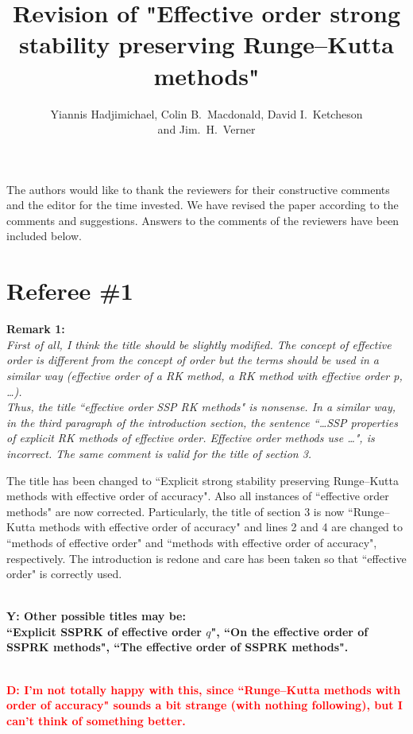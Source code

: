 \documentclass[12pt]{article}
\newcommand{\remark}[2]{\vspace{25pt} \noindent \textbf{Remark #1:\newline} \textit{#2}\vspace{15pt}}
\renewcommand{\newline}{\vspace{15pt}\\}
\newcommand{\david}[1]{\textcolor{red}{\\\textbf{D: \footnotesize #1}\\}}
\newcommand{\yiannis}[1]{\textcolor{OliveGreen}{\\\textbf{Y: \footnotesize #1}\\}}
\begin{document}
\title{Revision of "Effective order strong stability preserving Runge--Kutta methods"}
\author{Yiannis Hadjimichael, Colin B.~Macdonald, David I.~Ketcheson \\ and  Jim.~H.~Verner}

\maketitle

The authors would like to thank the reviewers for their constructive comments and the
editor for the time invested. 
We have revised the paper according to the comments and suggestions. 
Answers to the comments of the reviewers have been included below.
\vspace{30pt}

\section*{Referee \#1}
\remark{1}
{First of all, I think the title should be slightly modified. 
The concept of \textit{effective order} is different from the concept of \textit{order} 
but the terms should be used in a similar way (\textit{effective order of a RK method, 
a RK method with effective order p, \dots}).
\newline
Thus, the title ``effective order SSP RK methods" is nonsense.
In a similar way, in the third paragraph of the introduction section, the sentence 
``\dots SSP properties of explicit RK methods of effective order. Effective order 
methods use \dots", is incorrect.
The same comment is valid for the title of section 3.}

The title has been changed to ``Explicit strong stability preserving Runge--Kutta methods
with effective order of accuracy". 
Also all instances of ``effective order methods" are now corrected.
Particularly, the title of section 3 is now ``Runge--Kutta methods with effective order 
of accuracy" and lines 2 and 4 are changed to ``methods of effective order" and
``methods with effective order of accuracy", respectively.
The introduction is redone and care has been taken so that ``effective order" 
is correctly used.

\yiannis{Other possible titles may be:\\
``Explicit SSPRK of effective order $q$", ``On the effective order of SSPRK methods",
``The effective order of SSPRK methods".}

\david{I'm not totally happy with this, since ``Runge--Kutta methods with order of accuracy"
sounds a bit strange (with nothing following), but I can't think of something better.}
\end{document}
